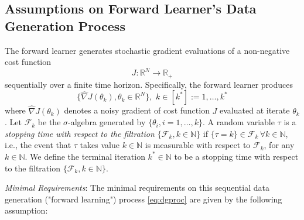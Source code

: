 \documentclass[journal,onecolumn]{IEEEtran}
\newcommand{\thk}{\theta_k}
\newcommand{\gradn}{\hat{\nabla}}
\newcommand{\rew}{J}
\newcommand{\reals}{\mathbb{R}}
\newcommand{\dimn}{N}
\newcommand{\N}{\mathbb{N}}
\newcommand{\ks}{k^*}
\begin{document}
{\color{black}\subsection{Assumptions on Forward Learner's Data Generation Process} The forward learner generates stochastic gradient evaluations of a non-negative cost function
\begin{equation}
\label{eq:rew}
    \rew\colon \reals^{\dimn} \to \reals_+
\end{equation}
sequentially over a finite time horizon. Specifically, the forward learner produces 
\begin{equation}
\label{eq:dgproc}
\{\gradn\rew(\thk), \thk\in\reals^{\dimn}\},\,\, k\in [\ks] := 1,\dots,\ks
\end{equation}
where $\gradn\rew(\thk)$ denotes a noisy gradient of cost function $\rew$ evaluated at iterate $\thk$. Let $\mathcal{F}_k$ be the $\sigma$-algebra generated by $\{\theta_i, i=1,\dots,k\}$. A random variable $\tau$ is a \textit{stopping time with respect to the filtration $\{\mathcal{F}_k, k\in\N\}$} if $\{\tau = k\} \in \mathcal{F}_k\, \forall k\in\mathbb{N}$, i.e., the event that $\tau$ takes value $k \in\N$ is measurable with respect to $\mathcal{F}_k$, for any $k\in\N$. We define the terminal iteration $\ks \in \N$ to be a stopping time with respect to the filtration $\{\mathcal{F}_k,k\in\N\}$. 



\textit{Minimal Requirements}: The minimal requirements on this sequential data generation ("forward learning") process \eqref{eq:dgproc} are given by the following assumption:

}
\end{document}
